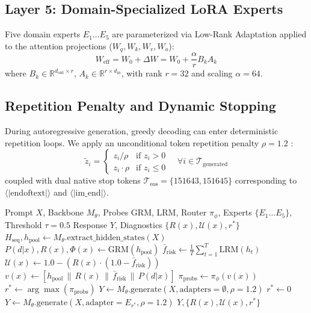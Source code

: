 \documentclass[journal,10pt,twocolumn]{IEEEtran}
\begin{document}
\subsection{Layer 5: Domain-Specialized LoRA Experts}
Five domain experts $E_1 \dots E_5$ are parameterized via Low-Rank Adaptation \cite{hu2022lora} applied to the attention projections ($W_q, W_k, W_v, W_o$):
\begin{equation}
W_{\text{eff}} = W_0 + \Delta W = W_0 + \frac{\alpha}{r} B_k A_k
\end{equation}
where $B_k \in \mathbb{R}^{d_{\text{out}} \times r}$, $A_k \in \mathbb{R}^{r \times d_{\text{in}}}$, with rank $r=32$ and scaling $\alpha=64$.

\subsection{Repetition Penalty and Dynamic Stopping}
During autoregressive generation, greedy decoding can enter deterministic repetition loops. We apply an unconditional token repetition penalty $\rho = 1.2$ \cite{keskar2019ctrl}:
\begin{equation}
\tilde{z}_i = \begin{cases} z_i / \rho & \text{if } z_i > 0 \\ z_i \cdot \rho & \text{if } z_i \le 0 \end{cases} \quad \forall i \in \mathcal{T}_{\text{generated}}
\end{equation}
coupled with dual native stop tokens $\mathcal{T}_{\text{eos}} = \{151643, 151645\}$ corresponding to $\langle|\text{endoftext}|\rangle$ and $\langle|\text{im\_end}|\rangle$.

\begin{algorithm}[t]
\caption{ARES Adaptive Inference Execution}
\label{alg:ares}
\begin{algorithmic}[1]
\REQUIRE Prompt $X$, Backbone $M_\theta$, Probes GRM, LRM, Router $\pi_\phi$, Experts $\{E_1 \dots E_5\}$, Threshold $\tau=0.5$
\ENSURE Response $Y$, Diagnostics $\{R(x), \mathcal{U}(x), r^*\}$
\STATE $H_{\text{seq}}, h_{\text{pool}} \leftarrow M_\theta.\text{extract\_hidden\_states}(X)$
\STATE $P(d|x), R(x), \Phi(x) \leftarrow \text{GRM}(h_{\text{pool}})$
\STATE $\bar{f}_{\text{risk}} \leftarrow \frac{1}{T} \sum_{t=1}^T \text{LRM}(h_t)$
\STATE $\mathcal{U}(x) \leftarrow 1.0 - (R(x) \cdot (1.0 - \bar{f}_{\text{risk}}))$
\STATE $v(x) \leftarrow [h_{\text{pool}} \,\|\, R(x) \,\|\, \bar{f}_{\text{risk}} \,\|\, P(d|x)]$
\STATE $\pi_{\text{probs}} \leftarrow \pi_\phi(v(x))$
\STATE $r^* \leftarrow \arg\max(\pi_{\text{probs}})$
    \STATE $Y \leftarrow M_\theta.\text{generate}(X, \text{adapters}=\emptyset, \rho=1.2)$ 
    \STATE $r^* \leftarrow 0$
\ELSE
    \STATE $Y \leftarrow M_\theta.\text{generate}(X, \text{adapter}=E_{r^*}, \rho=1.2)$ 
\ENDIF
\RETURN $Y, \{R(x), \mathcal{U}(x), r^*\}$
\end{algorithmic}
\end{algorithm}
\end{document}
